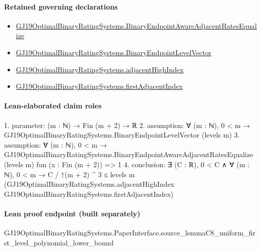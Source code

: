 \documentclass[10pt]{article}
\begin{document}
\paragraph{Retained governing declarations}
\begin{itemize}\raggedright
\item \hyperlink{governing-declaration-5a62c276eedad684}{GJ19\allowbreak{}Optimal\allowbreak{}Binary\allowbreak{}Rating\allowbreak{}Systems.\allowbreak{}Binary\allowbreak{}Endpoint\allowbreak{}Aware\allowbreak{}Adjacent\allowbreak{}Rates\allowbreak{}Equalize}
\item \hyperlink{governing-declaration-aa797f827cdcda67}{GJ19\allowbreak{}Optimal\allowbreak{}Binary\allowbreak{}Rating\allowbreak{}Systems.\allowbreak{}Binary\allowbreak{}Endpoint\allowbreak{}Level\allowbreak{}Vector}
\item \hyperlink{governing-declaration-28fccf34ba067e47}{GJ19\allowbreak{}Optimal\allowbreak{}Binary\allowbreak{}Rating\allowbreak{}Systems.\allowbreak{}adjacent\allowbreak{}High\allowbreak{}Index}
\item \hyperlink{governing-declaration-f116ab8d00b42dc7}{GJ19\allowbreak{}Optimal\allowbreak{}Binary\allowbreak{}Rating\allowbreak{}Systems.\allowbreak{}first\allowbreak{}Adjacent\allowbreak{}Index}
\end{itemize}
\paragraph{Lean-elaborated claim roles}\begin{ReviewVerbatim}
1. parameter: (m : ℕ) → Fin (m + 2) → ℝ
2. assumption: ∀ (m : ℕ), 0 < m → GJ19OptimalBinaryRatingSystems.BinaryEndpointLevelVector (levels m)
3. assumption: ∀ (m : ℕ),
  0 < m → GJ19OptimalBinaryRatingSystems.BinaryEndpointAwareAdjacentRatesEqualize (levels m) fun (x : Fin (m + 2)) => 1
4. conclusion: ∃ (C : ℝ),
  0 < C ∧
    ∀ (m : ℕ),
      0 < m →
        C / ↑(m + 2) ^ 3 ≤
          levels m (GJ19OptimalBinaryRatingSystems.adjacentHighIndex GJ19OptimalBinaryRatingSystems.firstAdjacentIndex)
\end{ReviewVerbatim}

\paragraph{Lean proof endpoint (built separately)}\begin{ReviewVerbatim}
GJ19OptimalBinaryRatingSystems.PaperInterface.source_lemmaC8_uniform_first_level_polynomial_lower_bound
\end{ReviewVerbatim}
\end{document}
